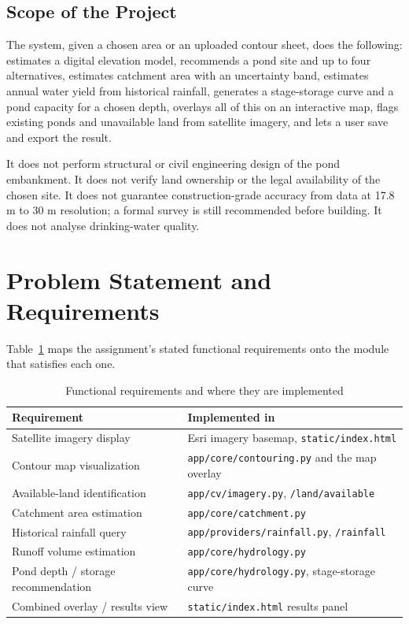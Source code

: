 \documentclass[manuscript,screen,review]{acmart}
\begin{document}
\subsection{Scope of the Project}
The system, given a chosen area or an uploaded contour sheet, does the following:
estimates a digital elevation model, recommends a pond site and up to four
alternatives, estimates catchment area with an uncertainty band, estimates annual
water yield from historical rainfall, generates a stage-storage curve and a pond
capacity for a chosen depth, overlays all of this on an interactive map, flags
existing ponds and unavailable land from satellite imagery, and lets a user save and
export the result.

It does not perform structural or civil engineering design of the pond embankment. It
does not verify land ownership or the legal availability of the chosen site. It does
not guarantee construction-grade accuracy from data at 17.8 m to 30 m resolution; a
formal survey is still recommended before building. It does not analyse drinking-water
quality.

\section{Problem Statement and Requirements}
\label{sec:requirements}

Table~\ref{tab:requirements} maps the assignment's stated functional requirements onto
the module that satisfies each one.

\begin{table}[h]
  \caption{Functional requirements and where they are implemented}
  \label{tab:requirements}
  \begin{tabular}{p{3.6cm}p{3.6cm}}
    \toprule
    Requirement & Implemented in \\
    \midrule
    Satellite imagery display & Esri imagery basemap, \texttt{static/index.html} \\
    Contour map visualization & \texttt{app/core/contouring.py} and the map overlay \\
    Available-land identification & \texttt{app/cv/imagery.py}, \texttt{/land/available} \\
    Catchment area estimation & \texttt{app/core/catchment.py} \\
    Historical rainfall query & \texttt{app/providers/rainfall.py}, \texttt{/rainfall} \\
    Runoff volume estimation & \texttt{app/core/hydrology.py} \\
    Pond depth / storage recommendation & \texttt{app/core/hydrology.py}, stage-storage curve \\
    Combined overlay / results view & \texttt{static/index.html} results panel \\
    \bottomrule
  \end{tabular}
\end{table}
\end{document}
